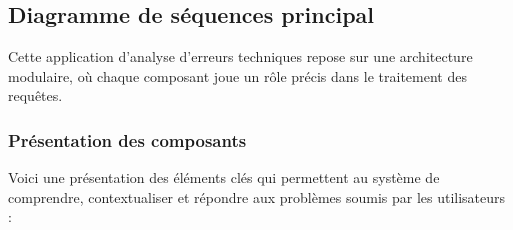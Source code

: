\documentclass[12pt,a4paper]{report}
\begin{document}
	\subsection{Diagramme de séquences principal}
	
	Cette application d'analyse d'erreurs techniques repose sur une architecture modulaire, où chaque composant joue un rôle précis dans le traitement des requêtes.
	
	\subsubsection{Présentation des composants}
	
	Voici une présentation des éléments clés qui permettent au système de comprendre, contextualiser et répondre aux problèmes soumis par les utilisateurs :
	
\end{document}
